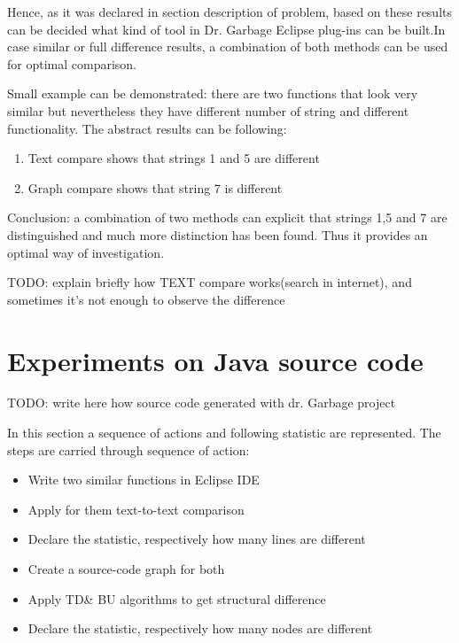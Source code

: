 \documentclass{report}
\begin{document}
Hence, as it was declared in section description of problem, based on these results can be decided what kind of tool in Dr. Garbage Eclipse plug-ins can be built.In case similar or full difference results, a combination of both methods can be used for optimal comparison. 

Small example can be demonstrated: there are two functions that look very similar but nevertheless they have different number of string and different functionality. The abstract results can be following:
\begin{enumerate}
	\item Text compare shows that strings 1 and 5 are different
	\item Graph compare shows that string 7 is different 
\end{enumerate}

Conclusion: a combination of two methods can explicit that strings 1,5 and 7 are distinguished and much more distinction has been found. Thus it provides an optimal way of investigation.



TODO: explain briefly how TEXT compare works(search in internet), and sometimes it's not enough to observe the difference


\section{Experiments on Java source code}

TODO: write here how source code generated with dr. Garbage project

In this section a sequence of actions and following statistic are represented. The steps are carried through sequence of action:
\begin{itemize}
	\item Write two similar functions in Eclipse IDE
	\item Apply for them text-to-text comparison
	\item Declare the statistic, respectively how many lines are different		
	\item Create a source-code graph for both
	\item Apply TD\& BU algorithms to get structural difference	
	\item Declare the statistic, respectively how many nodes are different			
\end{itemize}
\end{document}
